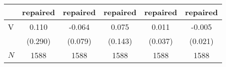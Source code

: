 {
\def\sym#1{\ifmmode^{#1}\else\(^{#1}\)\fi}
\begin{tabular}{l*{5}{c}}
\toprule
          &\multicolumn{1}{c}{repaired}&\multicolumn{1}{c}{repaired}&\multicolumn{1}{c}{repaired}&\multicolumn{1}{c}{repaired}&\multicolumn{1}{c}{repaired}\\
\midrule
V         &    0.110   &   -0.064   &    0.075   &    0.011   &   -0.005   \\
          &  (0.290)   &  (0.079)   &  (0.143)   &  (0.037)   &  (0.021)   \\
\midrule
\(N\)     &     1588   &     1588   &     1588   &     1588   &     1588   \\
\bottomrule
\end{tabular}
}
